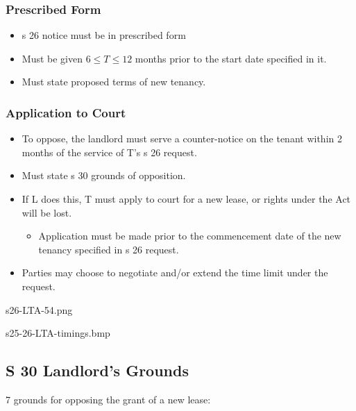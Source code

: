 \documentclass[
]{article}
\providecommand{\tightlist}{%
  \setlength{\itemsep}{0pt}\setlength{\parskip}{0pt}}
\begin{document}
\hypertarget{prescribed-form-1}{%
\subsubsection{Prescribed Form}\label{prescribed-form-1}}

\begin{itemize}
\tightlist
\item
  s 26 notice must be in prescribed form
\item
  Must be given {\(6 \leq T \leq 12\)} months prior to the start date
  specified in it.
\item
  Must state proposed terms of new tenancy.
\end{itemize}

\hypertarget{application-to-court-1}{%
\subsubsection{Application to Court}\label{application-to-court-1}}

\begin{itemize}
\tightlist
\item
  To oppose, the landlord must serve a counter-notice on the tenant
  within 2 months of the service of T's s 26 request.
\item
  Must state s 30 grounds of opposition.
\item
  If L does this, T must apply to court for a new lease, or rights under
  the Act will be lost.

  \begin{itemize}
  \tightlist
  \item
    Application must be made prior to the commencement date of the new
    tenancy specified in s 26 request.
  \end{itemize}
\item
  Parties may choose to negotiate and/or extend the time limit under the
  request.
\end{itemize}

s26-LTA-54.png

s25-26-LTA-timings.bmp

\hypertarget{s-30-landlords-grounds}{%
\subsection{S 30 Landlord's Grounds}\label{s-30-landlords-grounds}}

7 grounds for opposing the grant of a new lease:
\end{document}
